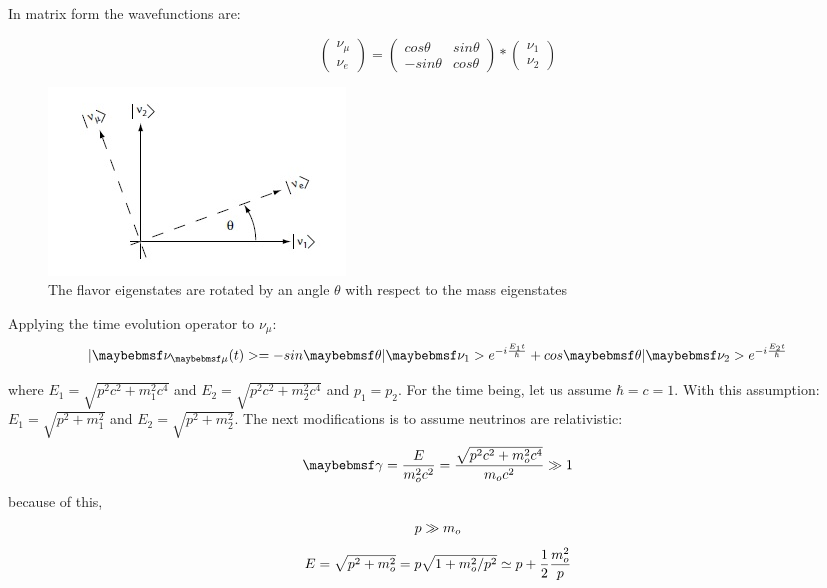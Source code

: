 In matrix form the wavefunctions are:

\begin{equation}
\begin{pmatrix}
\nu_{\mu} \\
\nu_{e}
\end{pmatrix} 
 = \begin{pmatrix}
cos\theta & sin\theta \\
-sin\theta & cos\theta 
\end{pmatrix}*
\begin{pmatrix}
\nu_{1} \\
\nu_{2} 
\end{pmatrix}
\end{equation}


\begin{figure}[htp]
\centering
\includegraphics[scale=.8]{figs/mixingangle.jpg}
\caption{The flavor eigenstates are rotated by an angle $\theta$ with respect to the mass eigenstates}
\label{fig:mixing}
\end{figure}

Applying the time evolution operator to $\nu_{\mu}$:
\begin{equation}
\centering
\label{eq:timeevol}
|\nu_{\mu}(t)> = -sin\theta|\nu_{1}>e^{-i\frac{E_{1}t}{\hbar}} + cos\theta|\nu_{2}>e^{-i\frac{E_{2}t}{\hbar}}
\end{equation}

where $E_{1} = \sqrt{p^2 c^2 + m^2_{1} c^4}$ and $E_{2} = \sqrt{p^2 c^2 + m^2_{2} c^4}$ and $p_{1}=p_{2}$. For the time being, let us assume $\hbar=c=1$. 
With this assumption:
$E_{1}=\sqrt{p^2+m^2_{1}}$ and $E_{2} = \sqrt{p^2 + m^2_{2}}$.
The next modifications is to assume neutrinos are relativistic:
\begin{equation}
\centering
\label{eq:gamma}
\gamma = \frac{E}{m^2_{o} c^2} = \frac{\sqrt{p^2 c^2 + m^2_{o} c^4}}{m_{o} c^2} \gg 1
\end{equation}
because of this,
\begin{equation}
\centering
p \gg m_{o}
\end{equation}
\begin{equation}
\centering
E = \sqrt{p^2 + m^2_{o}}=p\sqrt{1+m^2_{o}/p^2}\simeq p + \frac{1}{2}\frac{m^2_{o}}{p}
\end{equation}

